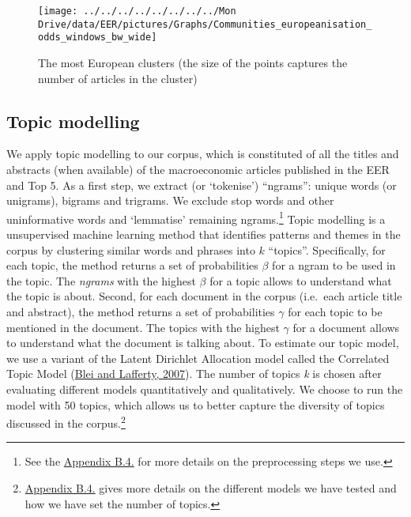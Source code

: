 \documentclass[
  12pt,
  onecolumn]{article}
\begin{document}
\begin{figure}[H]

{\centering \texttt{[image: ../../../../../../../../Mon Drive/data/EER/pictures/Graphs/Communities\_europeanisation\_odds\_windows\_bw\_wide]} 

}

\caption{The most European clusters (the size of the points captures the number of articles in the cluster)}\label{fig:plot-community-diff}
\end{figure}

\hypertarget{topic-modelling}{%
\subsection{Topic modelling}\label{topic-modelling}}

We apply topic modelling to our corpus, which is constituted of all the titles and abstracts (when available) of the macroeconomic articles published in the EER and Top 5. As a first step, we extract (or `tokenise') ``ngrams'': unique words (or unigrams), bigrams and trigrams. We exclude stop words and other uninformative words and `lemmatise' remaining ngrams.\footnote{See the \protect\hyperlink{topic}{Appendix B.4.} for more details on the preprocessing steps we use.} Topic modelling is a unsupervised machine learning method that identifies patterns and themes in the corpus by clustering similar words and phrases into \(k\) ``topics''. Specifically, for each topic, the method returns a set of probabilities \(\beta\) for a ngram to be used in the topic. The \emph{ngrams} with the highest \(\beta\) for a topic allows to understand what the topic is about. Second, for each document in the corpus (i.e.~each article title and abstract), the method returns a set of probabilities \(\gamma\) for each topic to be mentioned in the document. The topics with the highest \(\gamma\) for a document allows to understand what the document is talking about. To estimate our topic model, we use a variant of the Latent Dirichlet Allocation model called the Correlated Topic Model (\protect\hyperlink{ref-blei2007}{Blei and Lafferty, 2007}). The number of topics \emph{k} is chosen after evaluating different models quantitatively and qualitatively. We choose to run the model with 50 topics, which allows us to better capture the diversity of topics discussed in the corpus.\footnote{\protect\hyperlink{topic}{Appendix B.4.} gives more details on the different models we have tested and how we have set the number of topics.}
\end{document}
